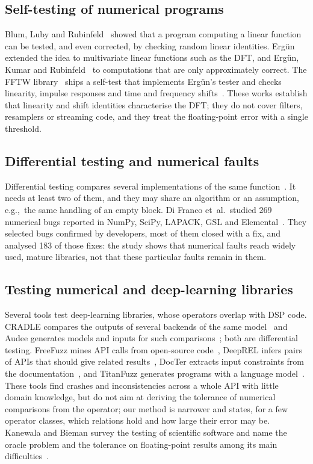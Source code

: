 \documentclass[10pt,conference]{IEEEtran}
\newcommand{\eg}{e.g.,\ }
\begin{document}
\subsection{Self-testing of numerical programs}
Blum, Luby and Rubinfeld~\cite{blum1993selftesting} showed that a program
computing a linear function can be tested, and even corrected, by checking
random linear identities. Erg\"un~\cite{ergun1995testing,ergun2000selftesting}
extended the idea to multivariate linear functions such as the DFT, and
Erg\"un, Kumar and Rubinfeld~\cite{ergun2001checking} to computations that are
only approximately correct. The FFTW library~\cite{frigo2005fftw} ships a
self-test that implements Erg\"un's tester and checks linearity, impulse
responses and time and frequency shifts~\cite{fftwverify}. These works establish that
linearity and shift identities characterise the DFT; they do not cover
filters, resamplers or streaming code, and they treat the floating-point error
with a single threshold.

\subsection{Differential testing and numerical faults}
Differential testing compares several implementations of the same
function~\cite{vanover2020fpdiff}. It needs at least two of them, and they may
share an algorithm or an assumption, \eg the same handling of an empty block.
Di Franco et~al.\ studied 269 numerical bugs reported in NumPy, SciPy,
LAPACK, GSL and Elemental~\cite{difranco2017floatingpoint}. They selected bugs
confirmed by developers, most of them closed with a fix, and analysed 183 of
those fixes: the study shows that numerical faults reach widely used, mature
libraries, not that these particular faults remain in them.

\subsection{Testing numerical and deep-learning libraries}
Several tools test deep-learning libraries, whose operators overlap with DSP
code. CRADLE compares the outputs of several backends of the same
model~\cite{pham2019cradle} and Audee generates models and inputs for such
comparisons~\cite{guo2020audee}; both are differential testing. FreeFuzz
mines API calls from open-source code~\cite{wei2022freefuzz}, DeepREL infers
pairs of APIs that should give related results~\cite{deng2022deeprel}, DocTer
extracts input constraints from the documentation~\cite{xie2022docter}, and
TitanFuzz generates programs with a language model~\cite{deng2023titanfuzz}.
These tools find crashes and inconsistencies across a whole API with little
domain knowledge, but do not aim at deriving the tolerance of numerical
comparisons from the operator; our
method is narrower and states, for a few operator classes, which relations
hold and how large their error may be. Kanewala and Bieman survey the testing
of scientific software and name the oracle problem and the tolerance on
floating-point results among its main
difficulties~\cite{kanewala2014scientific}.
\end{document}

